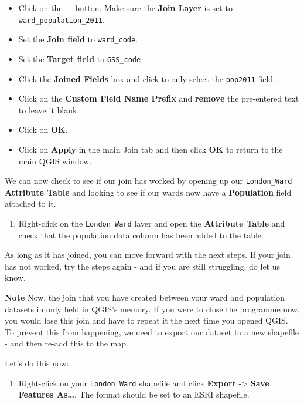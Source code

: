 \documentclass[
]{book}
\providecommand{\tightlist}{%
  \setlength{\itemsep}{0pt}\setlength{\parskip}{0pt}}
\begin{document}
\begin{itemize}
\tightlist
\item
  Click on the \textbf{+} button. Make sure the \textbf{Join Layer} is set to \texttt{ward\_population\_2011}.
\item
  Set the \textbf{Join field} to \texttt{ward\_code}.
\item
  Set the \textbf{Target field} to \texttt{GSS\_code}.
\item
  Click the \textbf{Joined Fields} box and click to only select the \texttt{pop2011} field.
\item
  Click on the \textbf{Custom Field Name Prefix} and \textbf{remove} the pre-entered text to leave it blank.
\item
  Click on \textbf{OK}.
\item
  Click on \textbf{Apply} in the main Join tab and then click \textbf{OK} to return to the main QGIS window.
\end{itemize}

We can now check to see if our join has worked by opening up our \texttt{London\_Ward} \textbf{Attribute Table} and looking to see if our wards now have a \textbf{Population} field attached to it.

\begin{enumerate}
\def\labelenumi{\arabic{enumi}.}
\setcounter{enumi}{17}
\tightlist
\item
  Right-click on the \texttt{London\_Ward} layer and open the \textbf{Attribute Table} and check that the population data column has been added to the table.
\end{enumerate}

As long as it has joined, you can move forward with the next steps. If your join has not worked, try the steps again - and if you are still struggling, do let us know.

\textbf{Note}
Now, the join that you have created between your ward and population datasets in only held in QGIS's memory. If you were to close the programme now, you would lose this join and have to repeat it the next time you opened QGIS. To prevent this from happening, we need to export our dataset to a new shapefile - and then re-add this to the map.

Let's do this now:

\begin{enumerate}
\def\labelenumi{\arabic{enumi}.}
\setcounter{enumi}{18}
\tightlist
\item
  Right-click on your \texttt{London\_Ward} shapefile and click \textbf{Export} -\textgreater{} \textbf{Save Features As\ldots{}}. The format should be set to an ESRI shapefile.
\end{enumerate}
\end{document}
